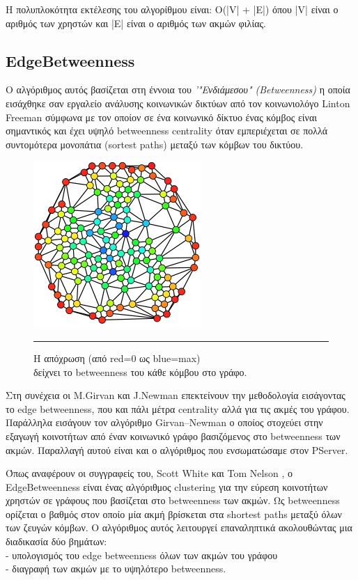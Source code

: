 Η πολυπλοκότητα εκτέλεσης του αλγορίθμου είναι: O(|V| + |E|) όπου |V| είναι ο αριθμός των χρηστών και |E| είναι ο αριθμός των ακμών φιλίας. 


\subsection{EdgeBetweenness}
\label{EdgeBetweenness}

\noindent
Ο αλγόριθμος αυτός βασίζεται στη έννοια του \emph{'"Ενδιάμεσου" (Betweenness)} η οποία εισάχθηκε σαν εργαλείο ανάλυσης κοινωνικών δικτύων
από τον κοινωνιολόγο Linton Freeman \cite{freeman1977set} σύμφωνα με τον οποίον σε 
ένα κοινωνικό δίκτυο ένας κόμβος είναι σημαντικός και έχει υψηλό
betweenness centrality όταν εμπεριέχεται σε πολλά συντομότερα μονοπάτια (sortest paths) μεταξύ των κόμβων του δικτύου.


\begin{figure}[htbp]
  \centering
      \includegraphics{Figures/GraphBetweenness.svg}
	\rule{35em}{0.5pt}  %
	\caption[graphBetweenness]{Η απόχρωση (από red=0 ως blue=max)\\ δείχνει το betweenness του κάθε κόμβου στο γράφο. \cite{GraphBetweenness}}
  \label{fig:GraphBetweenness}
\end{figure}


Στη συνέχεια οι Μ.Girvan και J.Newman \cite{Girvan11062002} επεκτείνουν την μεθοδολογία εισάγοντας το
edge betweenness, που και πάλι μέτρα centrality αλλά για τις ακμές του γράφου.
Παράλληλα εισάγουν τον αλγόριθμο Girvan–Newman ο οποίος στοχεύει στην εξαγωγή κοινοτήτων από έναν κοινωνικό γράφο
βασιζόμενος στο betweenness των ακμών. Παραλλαγή αυτού είναι και ο αλγόριθμος που ενσωματώσαμε στον PServer.

Όπως αναφέρουν οι συγγραφείς του, Scott White και Tom Nelson \cite{EdgeBetweenness}, ο  EdgeBetweenness  είναι ένας αλγόριθμος clustering για την 
εύρεση κοινοτήτων χρηστών σε γράφους που βασίζεται στο betweenness των ακμών. 
Ως betweenness ορίζεται ο βαθμός στον οποίο μία ακμή  βρίσκεται στα shortest paths μεταξύ όλων των ζευγών κόμβων.
 Ο αλγόριθμος αυτός λειτουργεί επαναληπτικά ακολουθώντας μια διαδικασία δύο βημάτων:\\
- υπολογισμός του edge betweenness όλων των ακμών του γράφου\\
- διαγραφή των ακμών με το υψηλότερο  betweenness.\\

